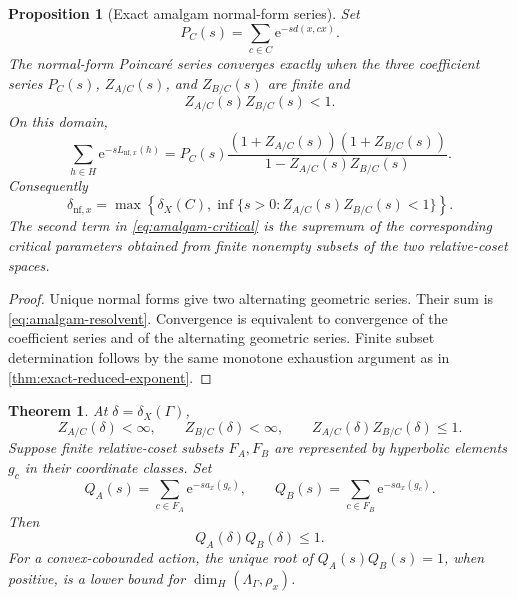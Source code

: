 \documentclass[11pt]{article}
\newtheorem{theorem}{Theorem}[section]
\newtheorem{proposition}[proposition]{Proposition}
\theoremstyle{definition}
\newcommand{\e}{\mathrm e}
\begin{document}
\begin{proposition}[Exact amalgam normal-form series]
\label{prop:amalgam-exact}
Set
\[
 P_C(s)=\sum_{c\in C}\e^{-sd(x,cx)}.
\]
The normal-form Poincar\'e series converges exactly when the three coefficient series
$P_C(s)$, $Z_{A/C}(s)$, and $Z_{B/C}(s)$ are finite and
\[
 Z_{A/C}(s)Z_{B/C}(s)<1.
\]
On this domain,
\begin{equation}\label{eq:amalgam-resolvent}
 \sum_{h\in H}\e^{-sL_{\mathrm{nf},x}(h)}
 =P_C(s)
 \frac{(1+Z_{A/C}(s))(1+Z_{B/C}(s))}
 {1-Z_{A/C}(s)Z_{B/C}(s)}.
\end{equation}
Consequently
\begin{equation}\label{eq:amalgam-critical}
 \delta_{\mathrm{nf},x}
 =\max\left\{\delta_X(C),
 \inf\{s>0:Z_{A/C}(s)Z_{B/C}(s)<1\}\right\}.
\end{equation}
The second term in \eqref{eq:amalgam-critical} is the supremum of the corresponding
critical parameters obtained from finite nonempty subsets of the two relative-coset spaces.
\end{proposition}

\begin{proof}
Unique normal forms give two alternating geometric series.  Their sum is
\eqref{eq:amalgam-resolvent}.  Convergence is equivalent to convergence of the coefficient
series and of the alternating geometric series.  Finite subset determination follows by the same
monotone exhaustion argument as in \cref{thm:exact-reduced-exponent}.
\end{proof}

\begin{theorem}
\label{thm:amalgam-critical-exponent}
At $\delta=\delta_X(\Gamma)$,
\begin{equation}\label{eq:amalgam-product}
 Z_{A/C}(\delta)<\infty,
 \qquad
 Z_{B/C}(\delta)<\infty,
 \qquad
 Z_{A/C}(\delta)Z_{B/C}(\delta)\le1.
\end{equation}
Suppose finite relative-coset subsets $F_A,F_B$ are represented by hyperbolic elements
$g_c$ in their coordinate classes.  Set
\[
 Q_A(s)=\sum_{c\in F_A}\e^{-sa_x(g_c)},
 \qquad
 Q_B(s)=\sum_{c\in F_B}\e^{-sa_x(g_c)}.
\]
Then
\begin{equation}\label{eq:axis-amalgam-product}
 Q_A(\delta)Q_B(\delta)\le1.
\end{equation}
For a convex-cobounded action, the unique root of
$Q_A(s)Q_B(s)=1$, when positive, is a lower bound for
$\dim_H(\Lambda_\Gamma,\rho_x)$.
\end{theorem}
\end{document}
